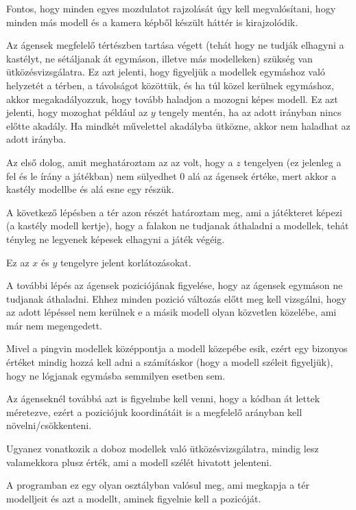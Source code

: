 
Fontos, hogy minden egyes mozdulatot rajzolását úgy kell megvalósítani, hogy minden más modell és a kamera képből készült háttér is kirajzolódik.
 

Az ágensek megfelelő tértészben tartása végett (tehát hogy ne tudják elhagyni a kastélyt, ne sétáljanak át egymáson, illetve más modelleken) szükség van ütközésvizsgálatra.
Ez azt jelenti, hogy figyeljük a modellek egymáshoz való helyzetét a térben, a távolságot közöttük, és ha túl közel kerülnek egymáshoz, akkor megakadályozzuk, hogy tovább haladjon a mozogni képes modell.
Ez azt jelenti, hogy  mozoghat  például az $y$ tengely mentén, ha az adott irányban nincs előtte akadály.
Ha mindkét művelettel akadályba ütközne, akkor nem haladhat az adott irányba.
 
Az első dolog, amit meghatároztam az az volt, hogy a $z$ tengelyen (ez jelenleg a fel és le írány a játékban) nem sülyedhet 0 alá az ágensek értéke, mert akkor a kastély modellbe és alá esne egy részük.

A következő lépésben a tér azon részét határoztam meg, ami a játékteret képezi (a kastély modell kertje), hogy a falakon ne tudjanak áthaladni a modellek, tehát tényleg ne legyenek képesek elhagyni a játék végéig.

Ez az $x$ és $y$ tengelyre jelent korlátozásokat.

A további lépés az ágensek poziciójának figyelése, hogy az ágensek egymáson ne tudjanak áthaladni. Ehhez minden pozició változás előtt meg kell vizsgálni, hogy az adott lépéssel nem kerülnek e a másik modell olyan közvetlen közelébe, ami már nem megengedett.

Mivel a pingvin modellek középpontja a modell közepébe esik, ezért egy bizonyos értéket mindig hozzá kell adni a számításkor (hogy a modell széleit figyeljük), hogy ne lógjanak egymásba semmilyen esetben sem. 

Az ágenseknél továbbá azt is figyelmbe kell venni, hogy a kódban át lettek méretezve, ezért a poziciójuk koordinátáit is a megfelelő arányban kell növelni/csökkenteni.

Ugyanez vonatkozik a doboz modellek való ütközésvizsgálatra, mindig lesz valamekkora plusz érték, ami a modell szélét hivatott jelenteni.

A programban ez egy olyan osztályban valósul meg, ami megkapja a tér modelljeit és azt a modellt, aminek figyelnie kell a pozicóját.
 
